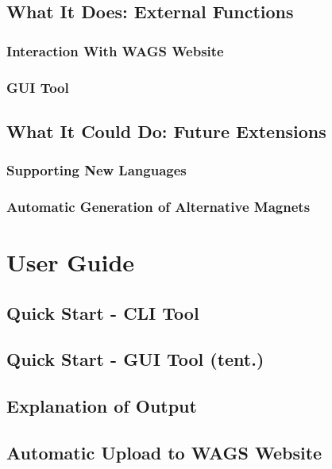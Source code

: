 \documentclass[letter,10pt]{article}
\begin{document}
\subsection{What It Does: External Functions}

\subsubsection{Interaction With WAGS Website}

\subsubsection{GUI Tool}


\subsection{What It Could Do: Future Extensions}

\subsubsection{Supporting New Languages}

\subsubsection{Automatic Generation of Alternative Magnets}



\section{User Guide}

\subsection{Quick Start - CLI Tool}

\subsection{Quick Start - GUI Tool (tent.)}

\subsection{Explanation of Output}

\subsection{Automatic Upload to WAGS Website}
\end{document}
